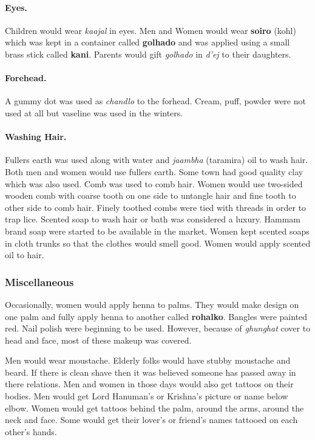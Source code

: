\paragraph{Eyes.} Children would wear \textit{kaajal} in eyes. Men and Women
would wear \textbf{soiro} (kohl) which was kept in a container called
\textbf{golhado} and was applied using a small brass stick called \textbf{kani}.
Parents would gift \textit{golhado} in \textit{d'ej} to their daughters.

\paragraph{Forehead.} A gummy dot was used as \textit{chandlo} to the forhead.
Cream, puff, powder were not used at all but vaseline was used in the winters.

\paragraph{Washing Hair.} Fullers earth was used along with water and
\textit{jaambha} (taramira) oil to wash hair. Both men and women would use
fullers earth. Some town had good quality clay which was also used. Comb was
used to comb hair. Women would use two-sided wooden comb with coarse tooth on
one side to untangle hair and fine tooth to other side to comb hair. Finely
toothed combs were tied with threads in order to trap lice. Scented soap to
wash hair or bath was considered a luxury. Hammam brand soap were started to be
available in the market. Women kept scented soaps in cloth trunks so that the
clothes would smell good. Women would apply scented oil to hair.

\subsubsection*{Miscellaneous}
Occasionally, women would apply henna to palms. They would make design on one
palm and fully apply henna to another called \textbf{rohalko}. Bangles were
painted red. Nail polish were beginning to be used. However, because of
\textit{ghunghat} cover to head and face, most of these makeup was covered.

Men would wear moustache. Elderly folks would have stubby moustache and beard.
If there is clean shave then it was believed someone has passed away in there
relations. Men and women in those days would also get tattoos on their bodies.
Men would get Lord Hanuman's or Krishna's picture or name below elbow. Women
would get tattoos behind the palm, around the arms, around the neck and face.
Some would get their lover's or friend's names tattooed on each other's hands.

